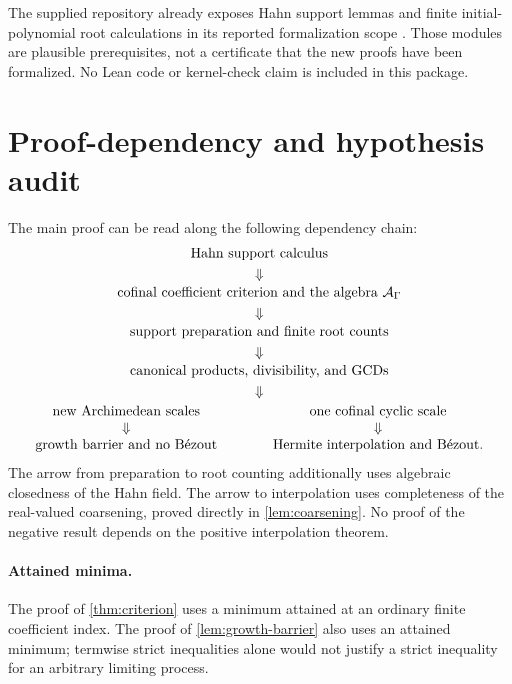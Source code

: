 \documentclass[11pt]{article}
\theoremstyle{plain}
\theoremstyle{plain}
\theoremstyle{plain}
\theoremstyle{definition}
\theoremstyle{definition}
\theoremstyle{definition}
\theoremstyle{remark}
\newcommand{\A}{\mathcal A_\Gamma}\newcommand{\OO}{\mathcal O_\Gamma}
\begin{document}
The supplied repository already exposes Hahn support lemmas and
finite initial-polynomial root calculations in its reported
formalization scope \cite{RepoRoot}. Those modules are plausible
prerequisites, not a certificate that the new proofs have been
formalized. No Lean code or kernel-check claim is included in this
package.

\appendix
\section{Proof-dependency and hypothesis audit}
\label{app:audit}

The main proof can be read along the following dependency chain:
\[
 \begin{gathered}
 \text{Hahn support calculus}\\
 \Downarrow\\[-2pt]
 \text{cofinal coefficient criterion and the algebra }\A\\
 \Downarrow\\[-2pt]
 \text{support preparation and finite root counts}\\
 \Downarrow\\[-2pt]
 \text{canonical products, divisibility, and GCDs}\\
 \Downarrow\\[-2pt]
 \begin{array}{c@{\qquad\qquad}c}
 \text{new Archimedean scales}&\text{one cofinal cyclic scale}\\
 \Downarrow&\Downarrow\\
 \text{growth barrier and no B\'ezout}&\text{Hermite interpolation and B\'ezout}.
 \end{array}
 \end{gathered}
\]
The arrow from preparation to root counting additionally uses
algebraic closedness of the Hahn field. The arrow to interpolation
uses completeness of the real-valued coarsening, proved directly in
\cref{lem:coarsening}. No proof of the negative result depends on the
positive interpolation theorem.

\paragraph{Attained minima.}
The proof of \cref{thm:criterion} uses a minimum attained at an ordinary
finite coefficient index. The proof of \cref{lem:growth-barrier} also
uses an attained minimum; termwise strict inequalities alone would not
justify a strict inequality for an arbitrary limiting process.
\end{document}
